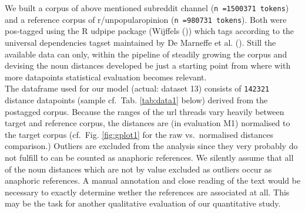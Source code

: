 \documentclass[
  12pt,
  oneside]{book}
\begin{document}
We built a corpus of above mentioned subreddit channel (\texttt{n\ =1500371\ tokens}) and a reference corpus of r/unpopularopinion (\texttt{n\ =980731\ tokens}). Both were pos-tagged using the R udpipe package (Wijffels ()) which tags according to the universal dependencies tagset maintained by De Marneffe et al. (). Still the available data can only, within the pipeline of steadily growing the corpus and devising the noun distances developed be just a starting point from where with more datapoints statistical evaluation becomes relevant.\\
The dataframe used for our model (actual: dataset 13) consists of \texttt{142321} distance datapoints (sample cf.~Tab. \ref{tab:data1} below) derived from the postagged corpus. Because the ranges of the url threads vary heavily between target and reference corpus, the distances are (in evaluation M1) normalised to the target corpus (cf.~Fig. \ref{fig:gplot1} for the raw vs.~normalised distances comparison.) Outliers are excluded from the analysis since they very probably do not fulfill to can be counted as anaphoric references. We silently assume that all of the noun distances which are not by value excluded as outliers occur as anaphoric references. A manual annotation and close reading of the text would be necessary to exactly determine wether the references are associated at all. This may be the task for another qualitative evaluation of our quantitative study.
\end{document}
